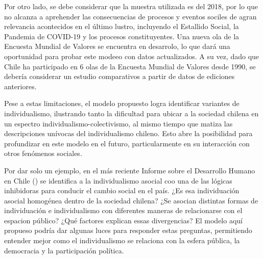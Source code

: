 \documentclass[
  letterpaper,
  DIV=11,
  numbers=noendperiod]{scrartcl}
\begin{document}
Por otro lado, se debe considerar que la muestra utilizada es del 2018,
por lo que no alcanza a aprehender las consecuencias de procesos y
eventos sociles de agran relevancia acontecidos en el último lustro,
incluyendo el Estallido Social, la Pandemia de COVID-19 y los procesos
constituyentes. Una nueva ola de la Encuesta Mundial de Valores se
encuentra en desarrolo, lo que dará una oportunidad para probar este
modeeo con datos actualizados. A su vez, dado que Chile ha participado
en 6 olas de la Encuesta Mundial de Valores desde 1990, se debería
considerar un estudio comparativos a partir de datos de ediciones
anteriores.

Pese a estas limitaciones, el modelo propuesto logra identificar
variantes de individualismo, ilustrando tanto la dificultad para ubicar
a la sociedad chilena en un espectro individualismo-colectivismo, al
mismo tiempo que matiza las descripciones unívocas del individualismo
chileno. Esto abre la posibilidad para profundizar en este modelo en el
futuro, particularmente en su interacción con otros fenómenos sociales.

Por dar solo un ejemplo, en el más reciente Informe sobre el Desarrollo
Humano en Chile () se identifica a la
individualismo asocial coo una de las lógicas inhibidoras para conducir
el cambio social en el país. ¿Es esa individuación asocial homogénea
dentro de la sociedad chilena? ¿Se asocian distintas formas de
individuación e individualismo con diferentes maneras de relacionarse
con el espacion público? ¿Qué factores explican essas divergencias? El
modelo aquí propueso podría dar algunas luces para responder estas
preguntas, permitiendo entender mejor como el individualismo se
relaciona con la esfera pública, la democracia y la participación
política.
\end{document}
